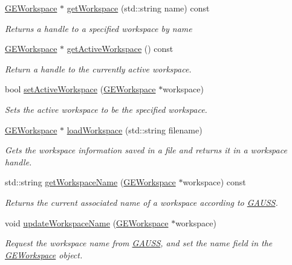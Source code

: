 \begin{DoxyCompactItemize}
\hyperlink{class_g_e_workspace}{G\-E\-Workspace} $\ast$ \hyperlink{class_g_a_u_s_s_afa9f47166e114a42a3f9b37895fb0faf}{get\-Workspace} (std\-::string name) const 
\begin{DoxyCompactList}\small\item\em Returns a handle to a specified workspace by {\itshape name} \end{DoxyCompactList}\item 
\hyperlink{class_g_e_workspace}{G\-E\-Workspace} $\ast$ \hyperlink{class_g_a_u_s_s_a0bb0be5509e0d5d8601ec061dd8ef31a}{get\-Active\-Workspace} () const 
\begin{DoxyCompactList}\small\item\em Return a handle to the currently active workspace. \end{DoxyCompactList}\item 
bool \hyperlink{class_g_a_u_s_s_a6b94adbb7ad799f1e025cd4d7f08f75b}{set\-Active\-Workspace} (\hyperlink{class_g_e_workspace}{G\-E\-Workspace} $\ast$workspace)
\begin{DoxyCompactList}\small\item\em Sets the active workspace to be the specified workspace. \end{DoxyCompactList}\item 
\hyperlink{class_g_e_workspace}{G\-E\-Workspace} $\ast$ \hyperlink{class_g_a_u_s_s_a7735659dac094c3af6c438011afb2a77}{load\-Workspace} (std\-::string filename)
\begin{DoxyCompactList}\small\item\em Gets the workspace information saved in a file and returns it in a workspace handle. \end{DoxyCompactList}\item 
std\-::string \hyperlink{class_g_a_u_s_s_ac0f6466e2f3f2553e3846614046b0652}{get\-Workspace\-Name} (\hyperlink{class_g_e_workspace}{G\-E\-Workspace} $\ast$workspace) const 
\begin{DoxyCompactList}\small\item\em Returns the current associated name of a workspace according to \hyperlink{class_g_a_u_s_s}{G\-A\-U\-S\-S}. \end{DoxyCompactList}\item 
void \hyperlink{class_g_a_u_s_s_a3c849e0f4162634039390e59ed61054e}{update\-Workspace\-Name} (\hyperlink{class_g_e_workspace}{G\-E\-Workspace} $\ast$workspace)
\begin{DoxyCompactList}\small\item\em Request the workspace name from \hyperlink{class_g_a_u_s_s}{G\-A\-U\-S\-S}, and set the {\itshape name} field in the \hyperlink{class_g_e_workspace}{G\-E\-Workspace} object. \end{DoxyCompactList}\item 

\end{DoxyCompactItemize}
